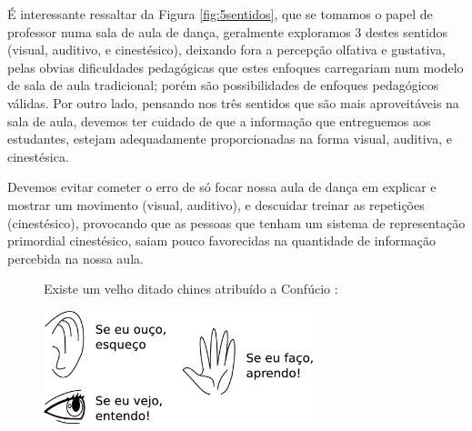 É interessante ressaltar da Figura \ref{fig:5sentidos}, 
que se tomamos o papel de professor  numa sala de aula de dança, 
geralmente exploramos 3 destes sentidos
(visual, auditivo, e cinestésico), 
deixando fora a percepção olfativa e gustativa, 
pelas obvias dificuldades pedagógicas que estes enfoques carregariam num modelo de sala de aula tradicional;
porém são possibilidades de enfoques pedagógicos válidas.
Por outro lado, pensando nos três sentidos que são mais aproveitáveis na sala de aula,
devemos ter cuidado de que a informação que entreguemos aos estudantes, 
estejam adequadamente proporcionadas na forma visual, auditiva, e cinestésica.
\begin{tcbattention}
Devemos evitar cometer o erro de só focar nossa aula de dança em explicar e mostrar um movimento (visual, auditivo),
e descuidar treinar as repetições (cinestésico), 
provocando que as pessoas que tenham um sistema de representação primordial cinestésico, 
saiam pouco favorecidas na quantidade de informação percebida na nossa aula.
\end{tcbattention}


\begin{figure}[!ht]
\begin{elaboracion}[title=Ditado chines, width= 1.00\linewidth]
Existe um velho ditado chines atribuído a Confúcio \cite[pp. 60, 63]{AprendendoInteligencia2008} \cite[pp. 9]{abe2002introducao}:

\begin{center}
    \includegraphics[width=0.7\textwidth]{chapters/cap-learning/ditadochines.eps}
\end{center}
\end{elaboracion}
\end{figure}

